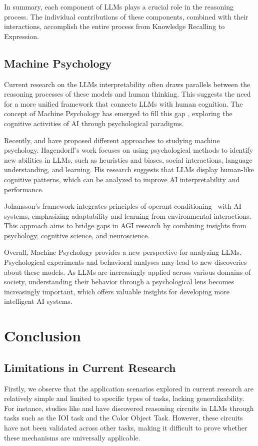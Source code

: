 \documentclass{article}
\begin{document}
In summary, each component of LLMs plays a crucial role in the reasoning process. The individual contributions of these components, combined with their interactions, accomplish the entire process from Knowledge Recalling to Expression.


\subsection{Machine Psychology} \label{subsec:MachinePsychology}
Current research on the LLMs interpretability often draws parallels between the reasoning processes of these models and human thinking. This suggests the need for a more unified framework that connects LLMs with human cognition. The concept of Machine Psychology has emerged to fill this gap \citep{MachinePsychologyOrigin}, exploring the cognitive activities of AI through psychological paradigms.

Recently, \citet{MachinePsychology_Hagendorff} and \citet{MachinePsychology_Johansson} have proposed different approaches to studying machine psychology.
Hagendorff's work focuses on using psychological methods to identify new abilities in LLMs, such as heuristics and biases, social interactions, language understanding, and learning. His research suggests that LLMs display human-like cognitive patterns, which can be analyzed to improve AI interpretability and performance.

Johansson's framework integrates principles of operant conditioning~\citep{OperantConditioning} with AI systems, emphasizing adaptability and learning from environmental interactions. This approach aims to bridge gaps in AGI research by combining insights from psychology, cognitive science, and neuroscience.

Overall, Machine Psychology provides a new perspective for analyzing LLMs. Psychological experiments and behavioral analyses may lead to new discoveries about these models. As LLMs are increasingly applied across various domains of society, understanding their behavior through a psychological lens becomes increasingly important, which offers valuable insights for developing more intelligent AI systems.


\section{Conclusion} \label{sec:Discussion}
\subsection{Limitations in Current Research}
Firstly, we observe that the application scenarios explored in current research are relatively simple and limited to specific types of tasks, lacking generalizability. For instance, studies like \citep{IOI_23_ICLR_Redwood} and \citep{ColorObject_24_ICLR_BrownU} have discovered reasoning circuits in LLMs through tasks such as the IOI task and the Color Object Task. However, these circuits have not been validated across other tasks, making it difficult to prove whether these mechanisms are universally applicable.
\end{document}
